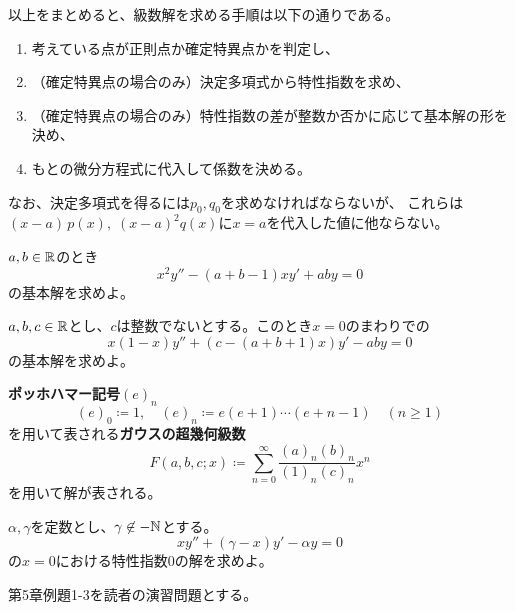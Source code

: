 \documentclass[report]{jlreq}
\begin{document}
以上をまとめると、級数解を求める手順は以下の通りである。
\begin{enumerate}
    \item 考えている点が正則点か確定特異点かを判定し、
    \item （確定特異点の場合のみ）決定多項式から特性指数を求め、
    \item （確定特異点の場合のみ）特性指数の差が整数か否かに応じて基本解の形を決め、
    \item もとの微分方程式に代入して係数を決める。
\end{enumerate}
なお、決定多項式を得るには$p_0, q_0$を求めなければならないが、
これらは$(x - a)\,p(x),\; (x-a)^2q(x)$に$x = a$を代入した値に他ならない。

\begin{problem}[4.2.5]
    $a, b \in \mathbb{R}$のとき
    \begin{equation}
        x^2 y'' - (a + b - 1) xy' + aby = 0
    \end{equation}
    の基本解を求めよ。
\end{problem}

\begin{problem}[4.2.6]
    $a, b, c \in \mathbb{R}$とし、$c$は整数でないとする。このとき$x = 0$のまわりでの
    \begin{equation}
        x(1 - x)y'' + (c - (a + b + 1)x) y' - aby = 0
    \end{equation}
    の基本解を求めよ。
\end{problem}

\textbf{ポッホハマー記号}$(e)_n$
\begin{equation}
    (e)_0 \coloneqq 1,\quad (e)_n \coloneqq e(e+1) \cdots (e+n-1)\quad (n \ge 1)
\end{equation}
を用いて表される\textbf{ガウスの超幾何級数}
\begin{equation}
    F(a, b, c; x) \coloneqq \sum_{n=0}^\infty \frac{(a)_n (b)_n}{(1)_n (c)_n} x^n
\end{equation}
を用いて解が表される。


\begin{problem}[合流型超幾何微分方程式]
    $\alpha, \gamma$を定数とし、$\gamma \not\in - \mathbb{N}$とする。
    \begin{equation}
        xy'' + (\gamma - x) y' - \alpha y = 0
    \end{equation}
    の$x = 0$における特性指数$0$の解を求めよ。
\end{problem}

\begin{problem}
    \cite{寺坂10} 第5章例題1-3を読者の演習問題とする。
\end{problem}
\end{document}
